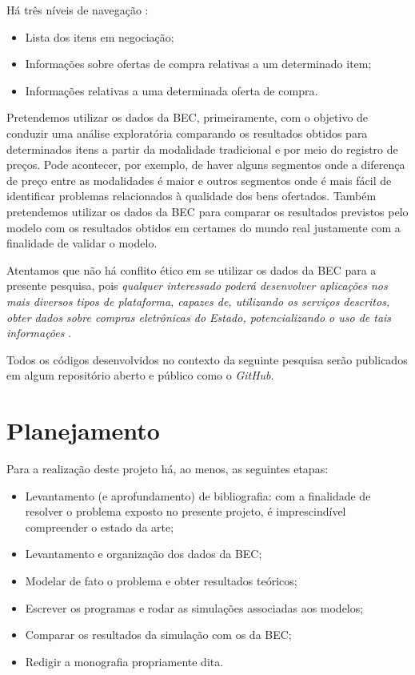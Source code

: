 Há três níveis de navegação \citep{manualbec}:
\begin{itemize}
    \item Lista dos itens em negociação;
    \item Informações sobre ofertas de compra relativas a um determinado item;
    \item Informações relativas a uma determinada oferta de compra.
\end{itemize}

Pretendemos utilizar os dados da BEC, primeiramente, com o objetivo de conduzir uma análise exploratória comparando os resultados obtidos para determinados itens a partir da modalidade tradicional e por meio do registro de preços. Pode acontecer, por exemplo, de haver alguns segmentos onde a diferença de preço entre as modalidades é maior e outros segmentos onde é mais fácil de identificar problemas relacionados à qualidade dos bens ofertados. Também pretendemos utilizar os dados da BEC para comparar os resultados previstos pelo modelo com os resultados obtidos em certames do mundo real justamente com a finalidade de validar o modelo.

Atentamos que não há conflito ético em se utilizar os dados da BEC para a presente pesquisa, pois \emph{qualquer interessado poderá desenvolver aplicações nos mais diversos tipos de plataforma, capazes de, utilizando os serviços descritos, obter dados sobre compras eletrônicas do Estado, potencializando o uso de tais informações} \citep{manualbec}.

Todos os códigos desenvolvidos no contexto da seguinte pesquisa serão publicados em algum repositório aberto e público como o \emph{GitHub}.

\section{Planejamento}
Para a realização deste projeto há, ao menos, as seguintes etapas:
\begin{itemize}
    \item Levantamento (e aprofundamento) de bibliografia: com a finalidade de resolver o problema exposto no presente projeto, é imprescindível compreender o estado da arte;
    \item Levantamento e organização dos dados da BEC;
    \item Modelar de fato o problema e obter resultados teóricos;
    \item Escrever os programas e rodar as simulações associadas aos modelos;
    \item Comparar os resultados da simulação com os da BEC;
    \item Redigir a monografia propriamente dita.
\end{itemize}

